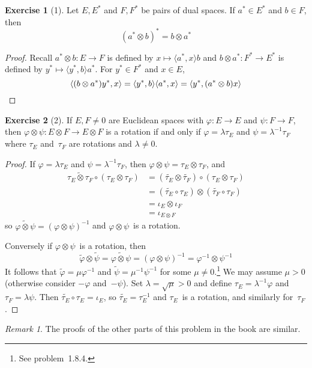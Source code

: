 \documentclass[letterpaper,12pt]{article}
\newcommand{\after}{\circ}
\newcommand{\tprod}{\otimes}
\newcommand{\sprod}[2]{\langle#1,#2\rangle}
\newcommand{\adj}[1]{\widetilde{#1}}
\theoremstyle{definition}
\newtheorem*{exer}{Exercise}
\theoremstyle{remark}
\newtheorem*{rmk}{Remark}
\begin{document}
\begin{exer}[1]
Let \(E,E^*\) and \(F,F^*\) be pairs of dual spaces. If \(a^*\in E^*\) and \(b\in F\), then
\[(a^*\tprod b)^*=b\tprod a^*\]
\end{exer}
\begin{proof}
Recall \(a^*\tprod b:E\to F\) is defined by \(x\mapsto\sprod{a^*}{x}b\) and \(b\tprod a^*:F^*\to E^*\) is defined by \(y^*\mapsto\sprod{y^*}{b}a^*\). For \(y^*\in F^*\) and \(x\in E\),
\[\sprod{(b\tprod a^*)y^*}{x}=\sprod{y^*}{b}\sprod{a^*}{x}=\sprod{y^*}{(a^*\tprod b)x}\qedhere\]
\end{proof}

\begin{exer}[2]
If \(E,F\ne 0\) are Euclidean spaces with \(\varphi:E\to E\) and \(\psi:F\to F\), then \(\varphi\tprod\psi:E\tprod F\to E\tprod F\) is a rotation if and only if \(\varphi=\lambda\tau_E\) and \(\psi=\lambda^{-1}\tau_F\) where \(\tau_E\) and~\(\tau_F\) are rotations and \(\lambda\ne 0\).
\end{exer}
\begin{proof}
If \(\varphi=\lambda\tau_E\) and \(\psi=\lambda^{-1}\tau_F\), then \(\varphi\tprod\psi=\tau_E\tprod\tau_F\), and
\begin{align*}
\adj{\tau_E\tprod\tau_F}\after(\tau_E\tprod\tau_F)&=(\adj{\tau_E}\tprod\adj{\tau_F})\after(\tau_E\tprod\tau_F)\\
	&=(\adj{\tau_E}\after\tau_E)\tprod(\adj{\tau_F}\after\tau_F)\\
	&=\iota_E\tprod\iota_F\\
	&=\iota_{E\tprod F}
\end{align*}
so \(\adj{\varphi\tprod\psi}=(\varphi\tprod\psi)^{-1}\) and \(\varphi\tprod\psi\)~is a rotation.

Conversely if \(\varphi\tprod\psi\)~is a rotation, then
\[\adj{\varphi}\tprod\adj{\psi}=\adj{\varphi\tprod\psi}=(\varphi\tprod\psi)^{-1}=\varphi^{-1}\tprod\psi^{-1}\]
It follows that \(\adj{\varphi}=\mu\varphi^{-1}\) and \(\adj{\psi}=\mu^{-1}\psi^{-1}\) for some \(\mu\ne 0\).\footnote{See problem~1.8.4.} We may assume \(\mu>0\) (otherwise consider \(-\varphi\) and~\(-\psi\)). Set \(\lambda=\sqrt{\mu}>0\) and define \(\tau_E=\lambda^{-1}\varphi\) and \(\tau_F=\lambda\psi\). Then \(\adj{\tau_E}\after\tau_E=\iota_E\), so \(\adj{\tau_E}=\tau_E^{-1}\) and \(\tau_E\)~is a rotation, and similarly for~\(\tau_F\).
\end{proof}
\begin{rmk}
The proofs of the other parts of this problem in the book are similar.
\end{rmk}
\end{document}

